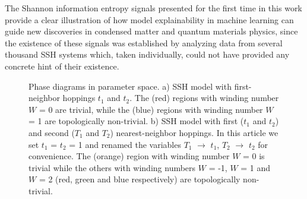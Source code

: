 \documentclass[10pt]{revtex4-1}
\begin{document}
The Shannon information entropy signals presented for the first time in this work provide a clear illustration of how model explainability in machine learning can guide new discoveries in condensed matter and quantum materials physics, since the existence of these signals was established by analyzing data from several thousand SSH systems which, taken individually, could not have provided any concrete hint of their existence. 

\begin{figure}
\centering
{}\quad
{}
\caption{Phase diagrams in parameter space. a) SSH model with first-neighbor hoppings $t_1$ and $t_2$. The (red) regions with winding number $W$ = 0 are trivial, while the (blue) regions with winding number $W$ = 1 are topologically non-trivial. b) SSH model with first ($t_1$ and $t_2$) and second ($T_1$ and $T_2$) nearest-neighbor hoppings. In this article we set $t_1$ = $t_2$ = 1 and renamed the variables $T_1$ $\rightarrow$ $t_1$, $T_2$ $\rightarrow$ $t_2$ for convenience. The (orange) region with winding number $W$ = 0 is trivial while the others with winding numbers $W$ = -1, $W$ = 1 and $W$ = 2 (red, green and blue respectively) are topologically non-trivial.}
\label{fig:phasediagrams}
\end{figure}
\end{document}

